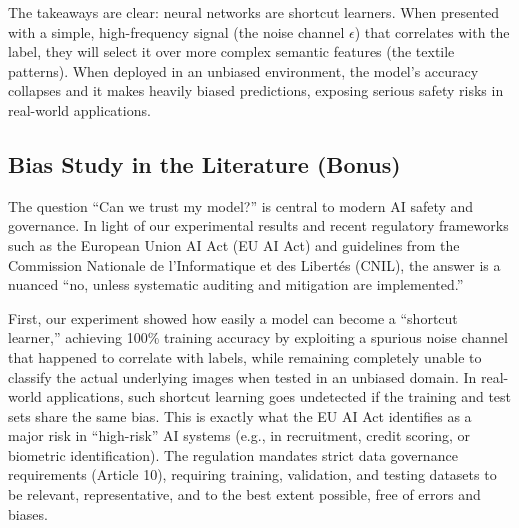 \documentclass{name}
\begin{document}
The takeaways are clear: neural networks are shortcut learners. When presented with a simple, high-frequency signal (the noise channel $\epsilon$) that correlates with the label, they will select it over more complex semantic features (the textile patterns). When deployed in an unbiased environment, the model's accuracy collapses and it makes heavily biased predictions, exposing serious safety risks in real-world applications.

\subsection{Bias Study in the Literature (Bonus)}
The question ``Can we trust my model?'' is central to modern AI safety and governance. In light of our experimental results and recent regulatory frameworks such as the European Union AI Act (EU AI Act) and guidelines from the Commission Nationale de l'Informatique et des Libertés (CNIL), the answer is a nuanced ``no, unless systematic auditing and mitigation are implemented.''

First, our experiment showed how easily a model can become a ``shortcut learner,'' achieving 100\% training accuracy by exploiting a spurious noise channel that happened to correlate with labels, while remaining completely unable to classify the actual underlying images when tested in an unbiased domain. In real-world applications, such shortcut learning goes undetected if the training and test sets share the same bias. This is exactly what the EU AI Act identifies as a major risk in ``high-risk'' AI systems (e.g., in recruitment, credit scoring, or biometric identification). The regulation mandates strict data governance requirements (Article 10), requiring training, validation, and testing datasets to be relevant, representative, and to the best extent possible, free of errors and biases.
\end{document}
